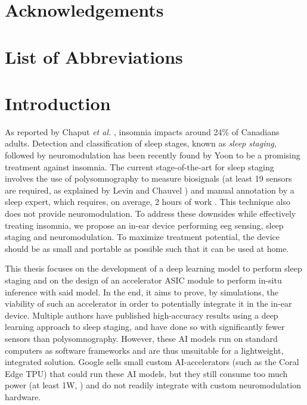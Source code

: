 \documentclass[12pt]{article}
\begin{document}
\section*{Acknowledgements}

\newpage

\tableofcontents
\newpage

\listoffigures
\newpage

\listoftables
\newpage

\section*{List of Abbreviations}

\newpage


\section{Introduction}
\label{sec:intro}
As reported by Chaput \textit{et al.} \cite{insomnia_prevalence}, insomnia impacts around 24\% of Canadians adults. Detection and classification of sleep stages, known as
\textit{sleep staging}, followed by neuromodulation has been recently found by Yoon \cite{yoon2021neuromodulation} to be a promising treatment against insomnia. The current
stage-of-the-art for sleep staging involves the use of polysomnography to measure biosignals (at least 19 sensors are required, as explained by Levin and Chauvel \cite{RUNDO2019381})
and manual annotation by a sleep expert, which requires, on average, 2 hours of work \cite{phan2022automatic}. This technique also does not provide neuromodulation. To address
these downsides while effectively treating insomnia, we propose an in-ear device performing \ac{eeg} sensing, sleep staging and neuromodulation. To maximize treatment potential,
the device should be as small and portable as possible such that it can be used at home.

This thesis focuses on the development of a deep learning model to perform sleep staging and on the design of an accelerator ASIC module to perform in-situ inference with said
model. In the end, it aims to prove, by simulations, the viability of such an accelerator in order to potentially integrate it in the in-ear device. Multiple authors
\cite{dutt2023sleepxai, fu2021deep, eldele2021attention} have published high-accuracy results using a deep learning approach to sleep staging, and have done so with significantly
fewer sensors than polysomnography. However, these AI models run on standard computers as software frameworks and are thus unsuitable for a lightweight, integrated solution.
Google sells small custom AI-accelerators (such as the Coral Edge TPU) that could run these AI models, but they still consume too much power (at least 1W, \cite{coral_datasheet})
and do not readily integrate with custom neuromodulation hardware.
\end{document}
